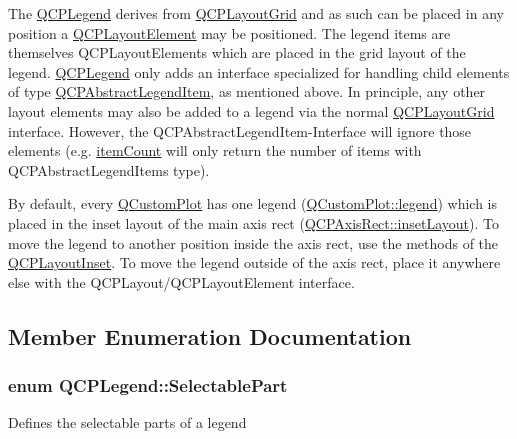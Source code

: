 \-The \hyperlink{classQCPLegend}{\-Q\-C\-P\-Legend} derives from \hyperlink{classQCPLayoutGrid}{\-Q\-C\-P\-Layout\-Grid} and as such can be placed in any position a \hyperlink{classQCPLayoutElement}{\-Q\-C\-P\-Layout\-Element} may be positioned. \-The legend items are themselves \-Q\-C\-P\-Layout\-Elements which are placed in the grid layout of the legend. \hyperlink{classQCPLegend}{\-Q\-C\-P\-Legend} only adds an interface specialized for handling child elements of type \hyperlink{classQCPAbstractLegendItem}{\-Q\-C\-P\-Abstract\-Legend\-Item}, as mentioned above. \-In principle, any other layout elements may also be added to a legend via the normal \hyperlink{classQCPLayoutGrid}{\-Q\-C\-P\-Layout\-Grid} interface. \-However, the \-Q\-C\-P\-Abstract\-Legend\-Item-\/\-Interface will ignore those elements (e.\-g. \hyperlink{classQCPLegend_a198228e9cdc78d3a3c306fa6763d0404}{item\-Count} will only return the number of items with \-Q\-C\-P\-Abstract\-Legend\-Items type).

\-By default, every \hyperlink{classQCustomPlot}{\-Q\-Custom\-Plot} has one legend (\hyperlink{classQCustomPlot_a4eadcd237dc6a09938b68b16877fa6af}{\-Q\-Custom\-Plot\-::legend}) which is placed in the inset layout of the main axis rect (\hyperlink{classQCPAxisRect_a4114887c7141b59650b7488f930993e5}{\-Q\-C\-P\-Axis\-Rect\-::inset\-Layout}). \-To move the legend to another position inside the axis rect, use the methods of the \hyperlink{classQCPLayoutInset}{\-Q\-C\-P\-Layout\-Inset}. \-To move the legend outside of the axis rect, place it anywhere else with the \-Q\-C\-P\-Layout/\-Q\-C\-P\-Layout\-Element interface. 

\subsection{\-Member \-Enumeration \-Documentation}
\hypertarget{classQCPLegend_a5404de8bc1e4a994ca4ae69e2c7072f1}{
\subsubsection[{\-Selectable\-Part}]{\setlength{\rightskip}{0pt plus 5cm}enum {\bf \-Q\-C\-P\-Legend\-::\-Selectable\-Part}}}\label{classQCPLegend_a5404de8bc1e4a994ca4ae69e2c7072f1}
\-Defines the selectable parts of a legend


